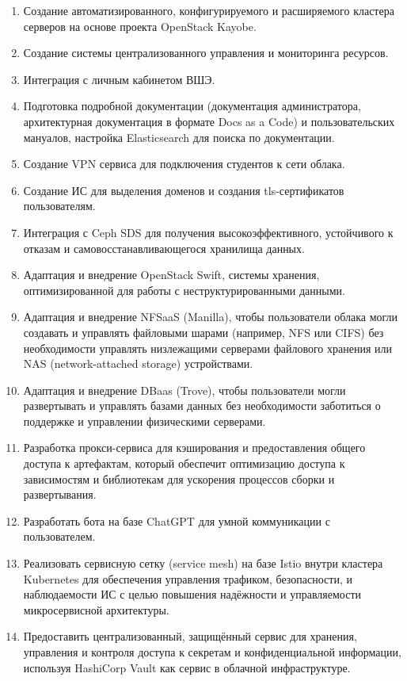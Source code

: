 \documentclass[14pt, a4paper]{extarticle}
\begin{document}
\begin{enumerate}
\item Создание автоматизированного, конфигурируемого и расширяемого кластера серверов на основе проекта OpenStack Kayobe.
\item Создание системы централизованного управления и мониторинга ресурсов.
\item Интеграция с личным кабинетом ВШЭ.
\item Подготовка подробной документации (документация администратора, архитектурная документация в формате Docs as a Code) и пользовательских мануалов, настройка Elasticsearch для поиска по документации.
\item Создание VPN сервиса для подключения студентов к сети облака.
\item Создание ИС для выделения доменов и создания tls-сертификатов пользователям.
\item Интеграция с Ceph SDS для получения высокоэффективного, устойчивого к отказам и самовосстанавливающегося хранилища данных.
\item Адаптация и внедрение OpenStack Swift, системы хранения, оптимизированной для работы с неструктурированными данными.
\item Адаптация и внедрение NFSaaS (Manilla), чтобы пользователи облака могли создавать и управлять файловыми шарами (например, NFS или CIFS) без необходимости управлять низлежащими серверами файлового хранения или NAS (network-attached storage) устройствами.
\item Адаптация и внедрение DBaas (Trove), чтобы пользователи могли развертывать и управлять базами данных без необходимости заботиться о поддержке и управлении физическими серверами.
\item Разработка прокси-сервиса для кэширования и предоставления общего доступа к артефактам, который обеспечит оптимизацию доступа к зависимостям и библиотекам для ускорения процессов сборки и развертывания.
\item Разработать бота на базе ChatGPT для умной коммуникации с пользователем.
\item Реализовать сервисную сетку (service mesh) на базе Istio внутри кластера Kubernetes для обеспечения управления трафиком, безопасности, и наблюдаемости ИС с целью повышения надёжности и управляемости микросервисной архитектуры.
\item Предоставить централизованный, защищённый сервис для хранения, управления и контроля доступа к секретам и конфиденциальной информации, используя HashiCorp Vault как сервис в облачной инфраструктуре.

\end{enumerate}
\end{document}

